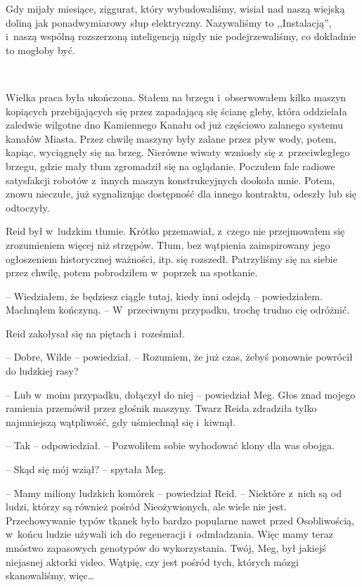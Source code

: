 \documentclass[oneside,polish,11pt,sfheadings]{mwbk}
\begin{document}
Gdy mijały miesiące, ziggurat, który wybudowaliśmy, wisiał nad naszą
wiejską doliną jak ponadwymiarowy słup elektryczny. Nazywaliśmy to
,,Instalacją'', i~naszą wspólną rozszerzoną inteligencją nigdy nie
podejrzewaliśmy, co dokładnie to mogłoby być.

~

Wielka praca była ukończona. Stałem na brzegu i~obserwowałem kilka
maszyn kopiących przebijających się przez zapadającą się ścianę gleby,
która oddzielała zaledwie wilgotne dno Kamiennego Kanału od już
częściowo zalanego systemu kanałów Miasta. Przez chwilę maszyny były
zalane przez pływ wody, potem, kapiąc, wyciągnęły się na brzeg. Nierówne
wiwaty wzniosły się z~przeciwległego brzegu, gdzie mały tłum zgromadził
się na oglądanie. Poczułem fale radiowe satysfakcji robotów z~innych
maszyn konstrukcyjnych dookoła mnie. Potem, znowu nieczułe, już
sygnalizując dostępność dla innego kontraktu, odeszły lub się odtoczyły.

Reid był w~ludzkim tłumie. Krótko przemawiał, z~czego nie przejmowałem
się zrozumieniem więcej niż strzępów. Tłum, bez wątpienia zainspirowany
jego ogłoszeniem historycznej ważności, itp. się rozszedł. Patrzyliśmy
się na siebie przez chwilę, potem pobrodziłem w~poprzek na spotkanie.

-- Wiedziałem, że będziesz ciągle tutaj, kiedy inni odejdą -- powiedziałem. Machnąłem kończyną. -- W~przeciwnym przypadku, trochę
trudno cię odróżnić.

Reid zakołysał się na piętach i~roześmiał.

-- Dobre, Wilde -- powiedział. -- Rozumiem, że już czas, żebyś ponownie
powrócił do ludzkiej rasy?

-- Lub w~moim przypadku, dołączył do niej -- powiedział Meg. Głos znad
mojego ramienia przemówił przez głośnik maszyny. Twarz Reida zdradziła
tylko najmniejszą wątpliwość, gdy uśmiechnął się i~kiwnął.

-- Tak -- odpowiedział. -- Pozwoliłem sobie wyhodować klony dla was obojga.

-- Skąd się mój wziął? -- spytała Meg.

-- Mamy miliony ludzkich komórek -- powiedział Reid. -- Niektóre z~nich są
od ludzi, którzy są również pośród Nieożywionych, ale wiele nie jest.
Przechowywanie typów tkanek było bardzo popularne nawet przed
Osobliwością, w~końcu ludzie używali ich do regeneracji i~odmładzania.
Więc mamy teraz mnóstwo zapasowych genotypów do wykorzystania. Twój,
Meg, był jakiejś niejasnej aktorki video. Wątpię, czy jest pośród tych,
których mózgi skanowaliśmy, więc\ldots
\end{document}
